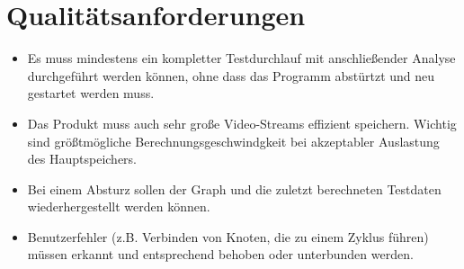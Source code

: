 \section{Qualitätsanforderungen}

\begin{itemize}
	\item Es muss mindestens ein kompletter Testdurchlauf mit anschließender Analyse durchgeführt werden können, ohne dass das Programm abstürtzt und neu gestartet werden muss.
	\item Das Produkt muss auch sehr große Video-Streams effizient speichern. Wichtig sind größtmögliche Berechnungsgeschwindgkeit bei akzeptabler Auslastung des Hauptspeichers.
	\item Bei einem Absturz sollen der Graph und die zuletzt berechneten Testdaten wiederhergestellt werden können.
	\item Benutzerfehler (z.B. Verbinden von Knoten, die zu einem Zyklus führen) müssen erkannt und entsprechend behoben oder unterbunden werden.
\end{itemize}
